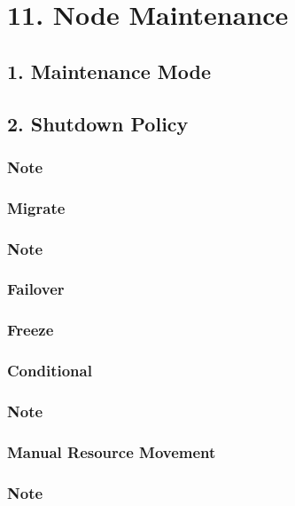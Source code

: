 \section{11. Node Maintenance}

\subsection{1. Maintenance Mode}

\subsection{2. Shutdown Policy}

\subsubsection{Note}

\subsubsection{Migrate}

\subsubsection{Note}

\subsubsection{Failover}

\subsubsection{Freeze}

\subsubsection{Conditional}

\subsubsection{Note}

\subsubsection{Manual Resource Movement}

\subsubsection{Note}

